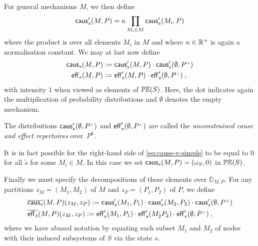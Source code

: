 For general mechanisms $M$, we then define
\begin{equation} \label{eq:cause-full} 
\mathsf{caus}'_s(M,P) = \kappa \prod_{M_i \in M} \mathsf{caus}'_s(M_i,P)
\end{equation}
where the product is over all elements $M_i$ in $M$ and where $\kappa \in \mathbb{R}^+$ is again a normalisation constant. We may at last now define 
\begin{align}\begin{split}\label{eq:ClassicalCauseEffRep}
\mathsf{caus}_s(M,P) &:=  \mathsf{caus}'_s(M,P) \cdot \mathsf{caus}'_s(\emptyset,P^{\scriptscriptstyle \bot}) 
 \\
\mathsf{eff}_s(M,P) &:=   \mathsf{eff}'_s(M,P) \cdot \mathsf{eff}'_s(\emptyset,P^{\scriptscriptstyle \bot}) \:,
\end{split}
\end{align}
with intensity $1$ when viewed as elements of $\mathbb{PE}(S)$.
Here, the dot indicates again the multiplication of probability distributions and $\emptyset$ denotes the empty mechanism.

The distributions $\mathsf{caus}'_s(\emptyset,P^{\scriptscriptstyle \bot})$ and $\mathsf{eff}'_s(\emptyset,P^{\scriptscriptstyle \bot})$ are called the \emph{unconstrained cause and effect repertoires} over~$P^\Bot$.

\begin{Remark}\label{rem:Vanishes}
It is in fact possible for the right-hand side of \eqref{eq:cause-v-simple} to be equal to $0$ for all $\tilde s$ for some $M_i \in M$. In this case we set $\mathsf{caus}_s(M,P) = ({\omega_{S}},0)$ in $\mathbb{PE}(S)$.
\end{Remark}

Finally we must specify the decompositions of these elements over $\mathbb D_{M,P}$. For any partitions $z_M = (M_1,M_2)$ of $M$ and $z_P = (P_1,P_2) $ of $P$, we define 
\begin{align}\begin{split}\label{eq:CDecompDef}
&\overline{\mathsf{caus}_s}({M,P})(z_M, z_P) :=  \mathsf{caus}'_s(M_1,P_1) \cdot \mathsf{caus}'_s(M_2,P_2) \cdot \mathsf{caus}'_s(\emptyset,P^{\scriptscriptstyle \bot})  \\
&\overline{\mathsf{eff}_s}({M,P})(z_M, z_P) :=  \mathsf{eff}'_s(M_1,P_1) \cdot \mathsf{eff}'_s(M_2^,P_2) \cdot \mathsf{eff}'_s(\emptyset,P^{\scriptscriptstyle \bot}) \:,
\end{split}\end{align}
where we have abused notation by equating each subset $M_1$ and $M_2$ of nodes with their induced subsystems of $S$ via the state $s$. 
\medskip

